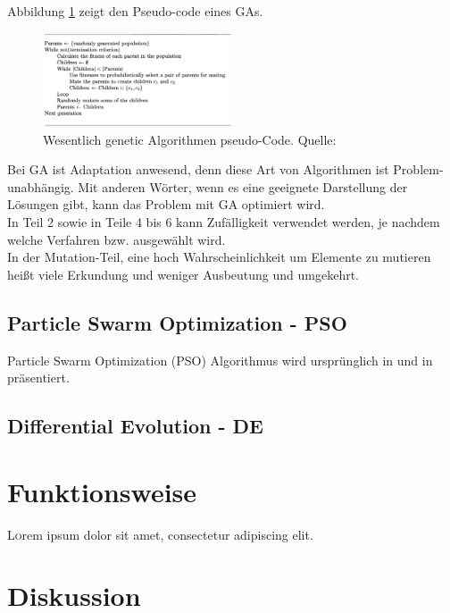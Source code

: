 \documentclass[twoside,twocolumn]{article}
\begin{document}
Abbildung \ref{fig:ga_pseudo} zeigt den Pseudo-code eines GAs.

\begin{figure}[h]
\caption{ Wesentlich genetic Algorithmen pseudo-Code. Quelle: \cite{wiley_evolutionary}}
\label{fig:ga_pseudo}
\centering
\includegraphics[width=0.5\textwidth]{images/ga_pseudo.png}
\end{figure}

Bei GA ist Adaptation anwesend, denn diese Art von Algorithmen ist Problem-unabhängig. Mit anderen Wörter, wenn es eine geeignete Darstellung der Lösungen gibt, kann das Problem mit GA optimiert wird.\\
In Teil 2 sowie in Teile 4 bis 6 kann Zufälligkeit verwendet werden, je nachdem welche Verfahren bzw. ausgewählt wird.\\
In der Mutation-Teil, eine hoch Wahrscheinlichkeit um Elemente zu mutieren heißt viele Erkundung und weniger Ausbeutung und umgekehrt.

\subsection{Particle Swarm Optimization - PSO}
Particle Swarm Optimization (PSO) Algorithmus wird ursprünglich in \cite{kennedy_pso} und in \cite{shi_pso} präsentiert.

\subsection{Differential Evolution - DE}
\blindtext %


\section{Funktionsweise}

\lettrine[nindent=0em,lines=3]{L} orem ipsum dolor sit amet, consectetur adipiscing elit.
\blindtext %


\section{Diskussion}
\end{document}
